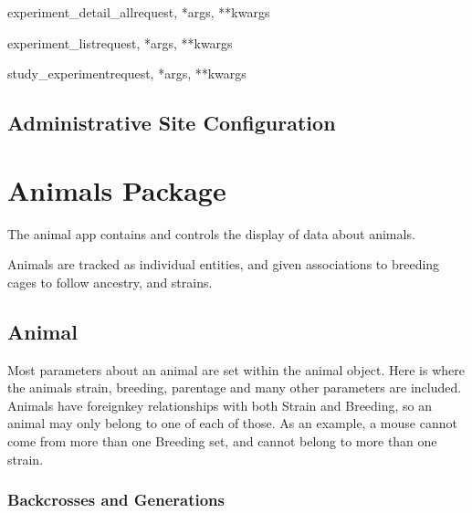 \documentclass[letterpaper,10pt,english]{sphinxmanual}
\begin{document}
\hypertarget{data.views.experiment\_detail\_all}{}\begin{funcdesc}{experiment\_detail\_all}{request, *args, **kwargs}\end{funcdesc}

\hypertarget{data.views.experiment\_list}{}\begin{funcdesc}{experiment\_list}{request, *args, **kwargs}\end{funcdesc}

\hypertarget{data.views.study\_experiment}{}\begin{funcdesc}{study\_experiment}{request, *args, **kwargs}\end{funcdesc}
\hypertarget{module-data.urls}{}
\modulesynopsis{}

\subsection{Administrative Site Configuration}
\hypertarget{module-data.admin}{}
\modulesynopsis{}

\section{Animals Package}
\hypertarget{module-animal}{}
\modulesynopsis{}
The animal app contains and controls the display of data about animals.

Animals are tracked as individual entities, and given associations to breeding cages to follow ancestry, and strains.


\subsection{Animal}

Most parameters about an animal are set within the animal object.  Here is where the animals strain, breeding, parentage and many other parameters are included.  Animals have foreignkey relationships with both Strain and Breeding, so an animal may only belong to one of each of those.  As an example, a mouse cannot come from more than one Breeding set, and cannot belong to more than one strain.


\subsubsection{Backcrosses and Generations}
\end{document}
